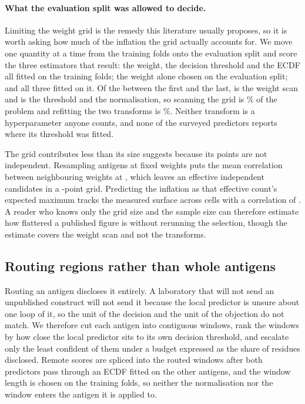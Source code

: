 \paragraph{What the evaluation split was allowed to decide.}
Limiting the weight grid is the remedy this literature usually proposes, so it
is worth asking how much of the inflation the grid actually accounts for. We
move one quantity at a time from the training folds onto the evaluation split
and score the three estimators that result: the weight, the decision threshold
and the ECDF all fitted on the training folds; the weight alone chosen on the
evaluation split; and all three fitted on it. Of the \SourceTotal{}
\BiasMetric{} between the first and the last, \SourceGrid{} is the weight scan
and \SourceTransform{} is the threshold and the normalisation, so scanning the
grid is \SourceGridShare{}\% of the problem and refitting the two transforms is
\SourceTransformShare{}\%. Neither transform is a hyperparameter anyone counts,
and none of the \SurveyAssessed{} surveyed predictors reports where its
threshold was fitted.

The grid contributes less than its size suggests because its points are not
independent. Resampling antigens at fixed weights puts the mean correlation
between neighbouring weights at \CorrGridCorrelation{}, which leaves an
effective \CorrEffectiveGrid{} independent candidates in a
\BiasFineGridPoints{}-point grid. Predicting the inflation as that effective
count's expected maximum tracks the measured surface across
\CorrValidationCells{} cells with a correlation of \CorrValidationR{}. A
reader who knows only the grid size and the sample size can therefore estimate
how flattered a published figure is without rerunning the selection, though
the estimate covers the weight scan and not the transforms.

\subsection{Routing regions rather than whole antigens}
\label{sec:region-routing}
Routing an antigen discloses it entirely. A laboratory that will not send an
unpublished construct will not send it because the local predictor is unsure
about one loop of it, so the unit of the decision and the unit of the
objection do not match. We therefore cut each antigen into contiguous windows,
rank the windows by how close the local predictor sits to its own decision
threshold, and escalate only the least confident of them under a budget
expressed as the share of residues disclosed. Remote scores are spliced into
the routed windows after both predictors pass through an ECDF fitted on the
other antigens, and the window length is chosen on the training folds, so
neither the normalisation nor the window enters the antigen it is applied to.


